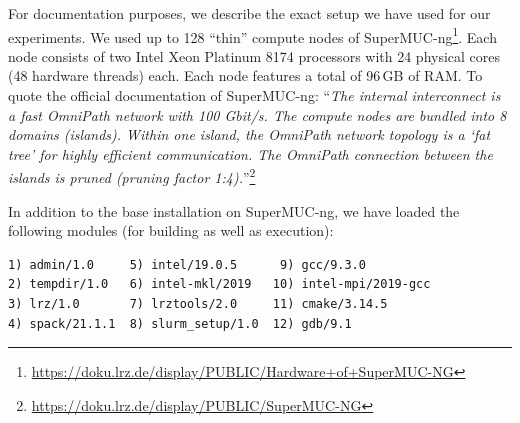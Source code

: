 \documentclass[runningheads]{article}
\numberwithin{dummy}{subsection}
\begin{document}
For documentation purposes, we describe the exact setup we have used for our experiments.
We used up to 128 ``thin'' compute nodes of SuperMUC-ng\footnote{\url{https://doku.lrz.de/display/PUBLIC/Hardware+of+SuperMUC-NG}}.
Each node consists of two Intel Xeon Platinum 8174 processors with 24 physical cores (48 hardware threads) each.
Each node features a total of 96\,GB of RAM.
To quote the official documentation of SuperMUC-ng: ``\textit{The internal interconnect is a fast OmniPath network with 100 Gbit/s.
The compute nodes are bundled into 8 domains (islands). Within one island, the OmniPath network topology is a `fat tree' for highly efficient communication. The OmniPath connection between the islands is pruned (pruning factor 1:4).}''\footnote{\url{https://doku.lrz.de/display/PUBLIC/SuperMUC-NG}}

In addition to the base installation on SuperMUC-ng, we have loaded the following modules (for building as well as execution):
{
\begin{verbatim}
1) admin/1.0     5) intel/19.0.5      9) gcc/9.3.0           
2) tempdir/1.0   6) intel-mkl/2019   10) intel-mpi/2019-gcc  
3) lrz/1.0       7) lrztools/2.0     11) cmake/3.14.5        
4) spack/21.1.1  8) slurm_setup/1.0  12) gdb/9.1    
\end{verbatim}
}
\end{document}
